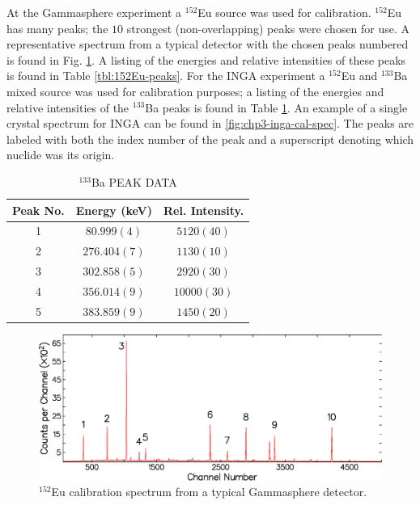 At the Gammasphere experiment a $^{152}$Eu source was used for calibration. $^{152}$Eu has many peaks; the $10$ strongest (non-overlapping) peaks were chosen for use. A representative spectrum from a typical detector with the chosen peaks numbered is found in Fig. \ref{fig:chp3-gs-cal-spec}.  A listing of the energies and relative intensities of these peaks is found in Table \ref{tbl:152Eu-peaks}. For the INGA experiment a $^{152}$Eu and $^{133}$Ba mixed source was used for calibration purposes; a listing of the energies and relative intensities of the $^{133}$Ba peaks is found in Table \ref{tbl:133Ba-peaks}. An example of a single crystal spectrum for INGA can be found in \ref{fig:chp3-inga-cal-spec}. The peaks are labeled with both the index number of the peak and a superscript denoting which nuclide was its origin.

\begin{table}[hb!]
\caption{$^{133}$Ba PEAK DATA \label{tbl:133Ba-peaks}}
\begin{center}
\begin{tabular}{ccc}
\toprule
Peak No. & Energy (keV) & Rel. Intensity. \\ 
\midrule
1 & $80.999(4)$ & $5120(40)$ \\ 
2 & $276.404(7)$ & $1130(10)$ \\ 
3 & $302.858(5)$ & $2920(30)$ \\ 
4 & $356.014(9)$ & $10000(30)$ \\ 
5 & $383.859(9)$ & $1450(20)$ \\ 
\bottomrule
\end{tabular} 
\end{center}
\end{table}

\begin{figure}[h!]
	\setlength{\capwidth}{\textwidth}
	\centerline{\includegraphics[height=0.25\textheight]{./img/c3/gs_cal_spec.eps}}
	\caption{$^{152}$Eu calibration spectrum from a typical Gammasphere detector.}
	\label{fig:chp3-gs-cal-spec}
	\setlength{\capwidth}{0.9\textwidth}
\end{figure}

